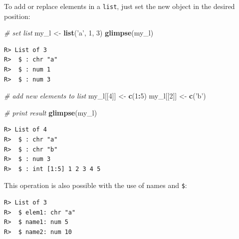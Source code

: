 \documentclass[
  12pt,
]{book}
\newenvironment{Shaded}{\begin{snugshade}}{\end{snugshade}}
\newcommand{\CommentTok}[1]{\textcolor[rgb]{0.37,0.37,0.37}{\textit{#1}}}
\newcommand{\DataTypeTok}[1]{\textcolor[rgb]{0.27,0.27,0.27}{#1}}
\newcommand{\DecValTok}[1]{\textcolor[rgb]{0.06,0.06,0.06}{#1}}
\newcommand{\KeywordTok}[1]{\textcolor[rgb]{0.27,0.27,0.27}{\textbf{#1}}}
\newcommand{\NormalTok}[1]{#1}
\newcommand{\OperatorTok}[1]{\textcolor[rgb]{0.43,0.43,0.43}{\textbf{#1}}}
\newcommand{\StringTok}[1]{\textcolor[rgb]{0.5,0.5,0.5}{#1}}
\begin{document}
To add or replace elements in a \texttt{list}, just set the new object in the desired position:

\begin{Shaded}
\begin{Highlighting}[]
\CommentTok{# set list}
\NormalTok{my_l <-}\StringTok{ }\KeywordTok{list}\NormalTok{(}\StringTok{'a'}\NormalTok{, }\DecValTok{1}\NormalTok{, }\DecValTok{3}\NormalTok{)}
\KeywordTok{glimpse}\NormalTok{(my_l)}
\end{Highlighting}
\end{Shaded}

\begin{verbatim}
R> List of 3
R>  $ : chr "a"
R>  $ : num 1
R>  $ : num 3
\end{verbatim}

\begin{Shaded}
\begin{Highlighting}[]
\CommentTok{# add new elements to list}
\NormalTok{my_l[[}\DecValTok{4}\NormalTok{]] <-}\StringTok{ }\KeywordTok{c}\NormalTok{(}\DecValTok{1}\OperatorTok{:}\DecValTok{5}\NormalTok{)}
\NormalTok{my_l[[}\DecValTok{2}\NormalTok{]] <-}\StringTok{ }\KeywordTok{c}\NormalTok{(}\StringTok{'b'}\NormalTok{)}

\CommentTok{# print result}
\KeywordTok{glimpse}\NormalTok{(my_l)}
\end{Highlighting}
\end{Shaded}

\begin{verbatim}
R> List of 4
R>  $ : chr "a"
R>  $ : chr "b"
R>  $ : num 3
R>  $ : int [1:5] 1 2 3 4 5
\end{verbatim}

This operation is also possible with the use of names and \texttt{\$}:

\begin{Shaded}
\end{Shaded}

\begin{verbatim}
R> List of 3
R>  $ elem1: chr "a"
R>  $ name1: num 5
R>  $ name2: num 10
\end{verbatim}
\end{document}
